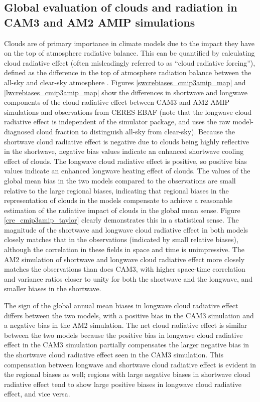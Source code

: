 \subsection{Global evaluation of clouds and radiation in CAM3 and AM2 AMIP simulations}
Clouds are of primary importance in climate models due to the impact they have on the top of atmosphere radiative balance. This can be quantified by calculating cloud radiative effect (often misleadingly referred to as ``cloud radiative forcing''), defined as the difference in the top of atmosphere radiation balance between the all-sky and clear-sky atmosphere \citep{ramanathan_et_al_1989}. Figures \ref{swcrebiases_cmip3amip_map} and \ref{lwcrebiases_cmip3amip_map} show the differences in shortwave and longwave components of the cloud radiative effect between CAM3 and AM2 AMIP simulations and observations from CERES-EBAF (note that the longwave cloud radiative effect is independent of the simulator package, and uses the raw model-diagnosed cloud fraction to distinguish all-sky from clear-sky). Because the shortwave cloud radiative effect is negative due to clouds being highly reflective in the shortwave, negative bias values indicate an enhanced shortwave cooling effect of clouds. The longwave cloud radiative effect is positive, so positive bias values indicate an enhanced longwave heating effect of clouds. The values of the global mean bias in the two models compared to the observations are small relative to the large regional biases, indicating that regional biases in the representation of clouds in the models compensate to achieve a reasonable estimation of the radiative impact of clouds in the global mean sense. Figure \ref{cre_cmip3amip_taylor} clearly demonstrates this in a statistical sense. The magnitude of the shortwave and longwave cloud radiative effect in both models closely matches that in the observations (indicated by small relative biases), although the correlation in these fields in space and time is unimpressive. The AM2 simulation of shortwave and longwave cloud radiative effect more closely matches the observations than does CAM3, with higher space-time correlation and variance ratios closer to unity for both the shortwave and the longwave, and smaller biases in the shortwave. 

The sign of the global annual mean biases in longwave cloud radiative effect differs between the two models, with a positive bias in the CAM3 simulation and a negative bias in the AM2 simulation. The net cloud radiative effect is similar between the two models because the positive bias in longwave cloud radiative effect in the CAM3 simulation partially compensates the larger negative bias in the shortwave cloud radiative effect seen in the CAM3 simulation. This compensation between longwave and shortwave cloud radiative effect is evident in the regional biases as well; regions with large negative biases in shortwave cloud radiative effect tend to show large positive biases in longwave cloud radiative effect, and vice versa.


